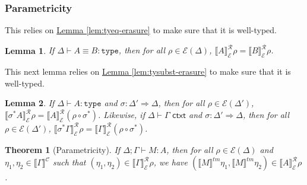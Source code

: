 \documentclass[natbib,preprint]{sigplanconf}
\newcommand{\sortType}{\texttt{type}}
\newcommand{\isCtxt}{\textsf{ ctxt}}
\newcommand{\relEnv}[1]{\mathcal{#1}}
\newcommand{\ctxtSem}[1]{\llbracket #1 \rrbracket^{\mathcal{C}}}
\newcommand{\tmSem}[1]{\llbracket #1 \rrbracket^{\mathit{tm}}}
\newcommand{\rsem}[3]{\llbracket #1 \rrbracket^{\mathcal{R}}_{#2}{#3}}
\newtheorem{lemma}{Lemma}
\newtheorem{theorem}{Theorem}
\newcommand{\lemref}[1]{\hyperref[#1]{Lemma \ref*{#1}}}
\begin{document}
\subsubsection{Parametricity}

This relies on \lemref{lem:tyeq-erasure} to make sure that it is
well-typed.

\begin{lemma}\label{lem:tyeq-rel}
  If $\Delta \vdash A \equiv B : \sortType$, then for all $\rho \in
  \relEnv{E}(\Delta)$, $\rsem{A}{\relEnv{E}}\rho = \rsem{B}{\relEnv{E}}\rho$.
\end{lemma}

This next lemma relies on \lemref{lem:tysubst-erasure} to make sure
that it is well-typed.

\begin{lemma}\label{lem:tysubst-rel}
  If $\Delta \vdash A : \sortType$ and $\sigma : \Delta' \Rightarrow
  \Delta$, then for all $\rho \in \relEnv{E}(\Delta')$,
  $\rsem{\sigma^*A}{\relEnv{E}}\rho = \rsem{A}{\relEnv{E}}{(\rho \circ \sigma^*)}$. Likewise,
  if $\Delta \vdash \Gamma \isCtxt$ and $\sigma : \Delta' \Rightarrow
  \Delta$, then for all $\rho \in \relEnv{E}(\Delta')$,
  $\rsem{\sigma^*\Gamma}{\relEnv{E}}\rho = \rsem{\Gamma}{\relEnv{E}}{(\rho \circ \sigma^*)}$.
\end{lemma}

\begin{theorem}[Parametricity]
  If $\Delta; \Gamma \vdash M : A$, then for all $\rho \in
  \relEnv{E}(\Delta)$ and $\eta_1, \eta_2 \in \ctxtSem{\Gamma}$ such
  that $(\eta_1, \eta_2) \in \rsem{\Gamma}{\relEnv{E}}\rho$, we have
  $(\tmSem{M}\eta_1, \tmSem{M}\eta_2) \in \rsem{A}{\relEnv{E}}\rho$.
\end{theorem}
\end{document}
